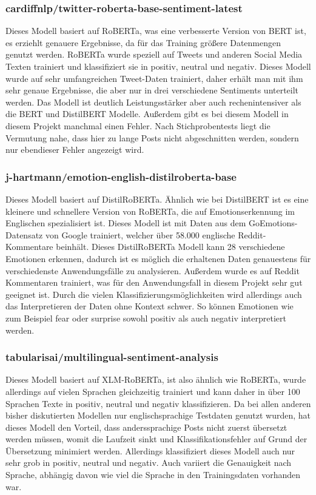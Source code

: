 \subsubsection{cardiffnlp/twitter-roberta-base-sentiment-latest}
Dieses Modell basiert auf RoBERTa, was eine verbesserte Version von BERT ist, es erziehlt genauere Ergebnisse, da für das Training größere Datenmengen genutzt werden. RoBERTa wurde speziell auf Tweets und anderen Social Media Texten trainiert und klassifiziert sie in positiv, neutral und negativ. Dieses Modell wurde auf sehr umfangreichen Tweet-Daten trainiert, daher erhält man mit ihm sehr genaue Ergebnisse, die aber nur in drei verschiedene Sentiments unterteilt werden. Das Modell ist deutlich Leistungsstärker aber auch rechenintensiver als die BERT und DistilBERT Modelle. Außerdem gibt es bei diesem Modell in diesem Projekt manchmal einen Fehler. Nach Stichprobentests liegt die Vermutung nahe, dass hier zu lange Posts nicht abgeschnitten werden, sondern nur ebendieser Fehler angezeigt wird.

\subsubsection{j-hartmann/emotion-english-distilroberta-base}
Dieses Modell basiert auf DistilRoBERTa. Ähnlich wie bei DistilBERT ist es eine kleinere und schnellere Version von RoBERTa, die auf Emotionserkennung im Englischen spezialisiert ist. Dieses Modell ist mit Daten aus dem GoEmotions-Datensatz von Google trainiert, welcher über 58.000 englische Reddit-Kommentare beinhält. Dieses DistilRoBERTa Modell kann 28 verschiedene Emotionen erkennen, dadurch ist es möglich die erhaltenen Daten genauestens für verschiedenste Anwendungsfälle zu analysieren. Außerdem wurde es auf Reddit Kommentaren trainiert, was für den Anwendungsfall in diesem Projekt sehr gut geeignet ist. Durch die vielen Klassifizierungsmöglichkeiten wird allerdings auch das Interpretieren der Daten ohne Kontext schwer. So können Emotionen wie zum Beispiel fear oder surprise sowohl positiv als auch negativ interpretiert werden.

\subsubsection{tabularisai/multilingual-sentiment-analysis}
Dieses Modell basiert auf XLM-RoBERTa, ist also ähnlich wie RoBERTa, wurde allerdings auf vielen Sprachen gleichzeitig trainiert und kann daher in über 100 Sprachen Texte in positiv, neutral und negativ klassifizieren. Da bei allen anderen bisher diskutierten Modellen nur englischsprachige Testdaten genutzt wurden, hat dieses Modell den Vorteil, dass anderssprachige Posts nicht zuerst übersetzt werden müssen, womit die Laufzeit sinkt und Klassifikationsfehler auf Grund der Übersetzung minimiert werden. Allerdings klassifiziert dieses Modell auch nur sehr grob in positiv, neutral und negativ. Auch variiert die Genauigkeit nach Sprache, abhängig davon wie viel die Sprache in den Trainingsdaten vorhanden war.

